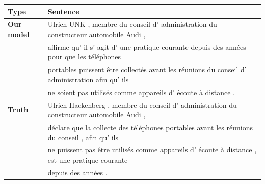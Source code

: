 \begin{table}[ht!]
\centering
\begin{footnotesize}
\begin{tabular}{|l|l|}
\hline
{\bf  Type} & {\bf Sentence} \\ 
\hline
\hline
{\bf Our model} & Ulrich UNK , membre du conseil d' administration du constructeur automobile Audi , \\
& affirme qu' il s' agit d' une pratique courante depuis des ann\'{e}es pour que les t\'{e}l\'{e}phones \\
& portables  puissent  \^{e}tre collect\'{e}s avant les r\'{e}unions du conseil d' administration afin qu' ils\\
&  ne soient pas  utilis\'{e}s comme appareils d' \'{e}coute \`{a} distance .\\
\hline
{\bf  Truth} &  Ulrich Hackenberg , membre du conseil d' administration du constructeur automobile Audi ,   \\
& d\'{e}clare que la collecte des t\'{e}l\'{e}phones portables avant les r\'{e}unions du conseil , afin qu' ils  \\
& ne puissent pas \^{e}tre utilis\'{e}s comme appareils d' \'{e}coute \`{a} distance , est une pratique courante \\ 
& depuis des ann\'{e}es .\\
\hline\hline

\end{tabular}
\end{footnotesize}
\end{table}

